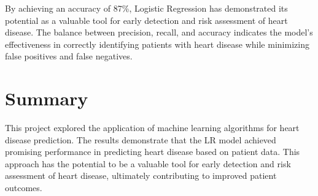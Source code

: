 By achieving an accuracy of 87\%, Logistic Regression has demonstrated its potential as a valuable tool for early detection and risk assessment of heart disease. The balance between precision, recall, and accuracy indicates the model's effectiveness in correctly identifying patients with heart disease while minimizing false positives and false negatives.

\section{Summary}
This project explored the application of machine learning algorithms for heart disease prediction. The results demonstrate that the LR model achieved promising performance in predicting heart disease based on patient data. This approach has the potential to be a valuable tool for early detection and risk assessment of heart disease, ultimately contributing to improved patient outcomes.